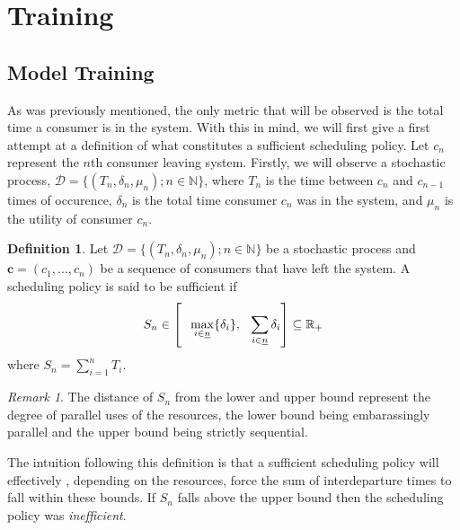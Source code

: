 \documentclass{article}
\theoremstyle{definition}
\newtheorem{definition}{Definition}[section]
\theoremstyle{remark}
\newtheorem*{remark}{Remark}
\begin{document}
	\section{Training}

		\subsection{Model Training}
		
		As was previously mentioned, the only metric that will be observed is the total time a consumer is in the system. With this in mind, we will first give a first attempt at a definition of what constitutes a sufficient scheduling policy. Let $c_{n}$ represent the $n$th consumer leaving system. Firstly, we will observe a stochastic process, $\mathcal{D} = \{(T_{n}, \delta_{n}, \mu_{n}); n \in \mathbb{N}\}$, where $T_{n}$ is the time between $c_{n}$ and $c_{n-1}$ times of occurence, $\delta_{n}$ is the total time consumer $c_{n}$ was in the system, and $\mu_{n}$ is the utility of consumer $c_{n}$.
	
		\begin{definition}
			Let $\mathcal{D} = \{(T_{n}, \delta_{n}, \mu_{n}); n \in \mathbb{N}\}$ be a stochastic process and $\mathbf{c} = (c_{1}, \ldots ,c_{n})$ be a sequence of consumers that have left the system. A scheduling policy is said to be sufficient if
			\[
			S_{n} \in \left[\hspace{0.1in}\max_{i \in \underline{n}}\{\delta_{i}\}, \hspace{0.1in} \sum_{i \in \underline{n}}{\delta_{i}}\right] \subseteq \mathbb{R}_{+}
			\] 
			where $S_{n} = \sum_{i=1}^{n}{T_{i}}$.
		\end{definition}
		
		\begin{remark}
			The distance of $S_{n}$ from the lower and upper bound represent the degree of parallel uses of the resources, the lower bound being embarassingly parallel and the upper bound being strictly sequential.
		\end{remark}
		The intuition following this definition is that a sufficient scheduling policy will effectively , depending on the resources, force the sum of interdeparture times to fall within these bounds. If $S_{n}$ falls above the upper bound then the scheduling policy was \emph{inefficient}.
	
\end{document}
